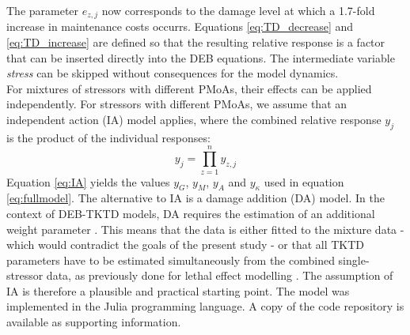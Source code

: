 \documentclass[utf8]{FrontiersinHarvard} %
\begin{document}
The parameter $e_{z,j}$ now corresponds to the damage level at which a 1.7-fold increase in maintenance costs occurrs.  
Equations \ref{eq:TD_decrease} and \ref{eq:TD_increase} are defined so that the resulting relative response is a factor 
that can be inserted directly into the DEB equations. 
The intermediate variable \textit{stress} \citep{jagerRevisitingSimplifiedDEBtox2020}
can be skipped without consequences for the model dynamics. \\
%
For mixtures of stressors with different PMoAs, their effects can be applied independently. 
For stressors with different PMoAs, we assume that an independent action (IA) model applies, 
where the combined relative response $y_j$ is the product of the individual responses: 
%
\begin{equation}
    y_{j} = \prod\limits_{z=1}^{n} y_{z,j}
    \label{eq:IA}
\end{equation}
%
Equation \ref{eq:IA} yields the values $y_G$, $y_M$, $y_A$ and $y_{\kappa}$ used in equation \ref{eq:fullmodel}.
The alternative to IA is a damage addition (DA) model. In the context of DEB-TKTD models, DA requires the estimation 
of an additional weight parameter \citep{jagerBiologybasedApproachMixture2010}. This means that the data is either fitted to the mixture data - 
which would contradict the goals of the present study - or that all TKTD parameters have to be estimated simultaneously 
from the combined single-stressor data, as previously done for lethal effect modelling \citep{bartPredictingMixtureEffects2021}. 
The assumption of IA is therefore a plausible and practical starting point.
%
The model was implemented in the Julia programming language. 
A copy of the code repository is available as supporting information.
%
\end{document}
